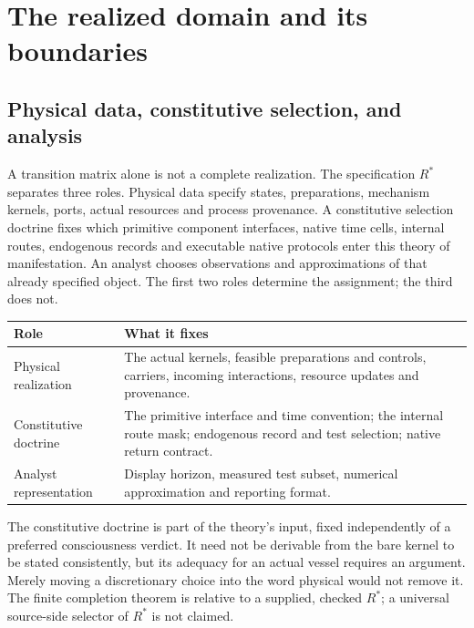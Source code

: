 \endgroup

\begingroup
\setlength{\parskip}{0pt}
\chapter{The realized domain and its boundaries}\label{ch:realization}
\section{Physical data, constitutive selection, and analysis}\label{sec:realization-three-layers}
A transition matrix alone is not a complete realization. The specification $R^\ast$ separates three roles. Physical data specify states, preparations, mechanism kernels, ports, actual resources and process provenance. A constitutive selection doctrine fixes which primitive component interfaces, native time cells, internal routes, endogenous records and executable native protocols enter this theory of manifestation. An analyst chooses observations and approximations of that already specified object. The first two roles determine the assignment; the third does not.

\begin{center}\small
\begin{tabularx}{\textwidth}{@{}p{}Y@{}}\toprule
Role & What it fixes\\\midrule
Physical realization & The actual kernels, feasible preparations and controls, carriers, incoming interactions, resource updates and provenance.\\
Constitutive doctrine & The primitive interface and time convention; the internal route mask; endogenous record and test selection; native return contract.\\
Analyst representation & Display horizon, measured test subset, numerical approximation and reporting format.\\\bottomrule
\end{tabularx}
\end{center}

The constitutive doctrine is part of the theory's input, fixed independently of a preferred consciousness verdict. It need not be derivable from the bare kernel to be stated consistently, but its adequacy for an actual vessel requires an argument. Merely moving a discretionary choice into the word physical would not remove it. The finite completion theorem is relative to a supplied, checked $R^\ast$; a universal source-side selector of $R^\ast$ is not claimed.

